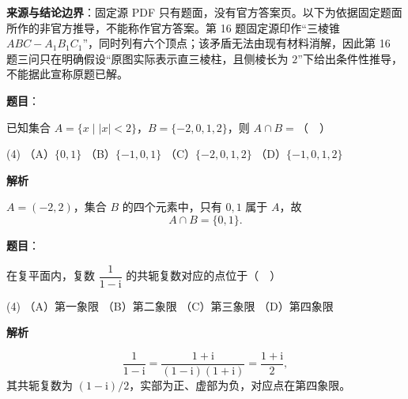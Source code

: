 
\begin{gktip}
\textbf{来源与结论边界}：固定源 PDF 只有题面，没有官方答案页。以下为依据固定题面所作的非官方推导，不能称作官方答案。第 16 题固定源印作“三棱锥 $ABC-A_1B_1C_1$”，同时列有六个顶点；该矛盾无法由现有材料消解，因此第 16 题三问只在明确假设“原图实际表示直三棱柱，且侧棱长为 $2$”下给出条件性推导，不能据此宣称原题已解。
\end{gktip}


\begin{answer}

\textbf{题目}：

已知集合 $A=\{x\mid |x|<2\}$，$B=\{-2,0,1,2\}$，则 $A\cap B=$（　）

\begin{gkopts}(4)
\task （A）$\{0,1\}$
\task （B）$\{-1,0,1\}$
\task （C）$\{-2,0,1,2\}$
\task （D）$\{-1,0,1,2\}$
\end{gkopts}

\textbf{解析}

$A=(-2,2)$，集合 $B$ 的四个元素中，只有 $0,1$ 属于 $A$，故
\nopagebreak[4]
\[
A\cap B=\{0,1\}.
\]


\end{answer}
\begin{answer}

\textbf{题目}：

在复平面内，复数 $\dfrac{1}{1-\mathrm i}$ 的共轭复数对应的点位于（　）

\begin{gkopts}(4)
\task （A）第一象限
\task （B）第二象限
\task （C）第三象限
\task （D）第四象限
\end{gkopts}

\textbf{解析}

\nopagebreak[4]
\[
\frac1{1-\mathrm i}=\frac{1+\mathrm i}{(1-\mathrm i)(1+\mathrm i)}=\frac{1+\mathrm i}{2},
\]
其共轭复数为 $(1-\mathrm i)/2$，实部为正、虚部为负，对应点在第四象限。


\end{answer}
